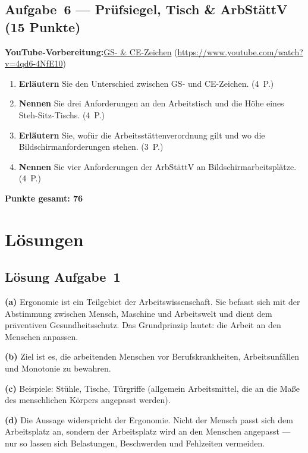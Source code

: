 \documentclass[11pt, a4paper]{article}
\begin{document}
\subsection*{Aufgabe~6 --- Prüfsiegel, Tisch \& ArbStättV (15 Punkte)}

\noindent\textbf{\color{bfwAccent}YouTube-Vorbereitung:}\enspace \href{https://www.youtube.com/watch?v=4qd6-4NfE10}{GS- \& CE-Zeichen} (\url{https://www.youtube.com/watch?v=4qd6-4NfE10})

\medskip
\begin{enumerate}[label=(\alph*)]
  \item \textbf{Erläutern} Sie den Unterschied zwischen GS- und CE-Zeichen. \hfill (4~P.)
  \item \textbf{Nennen} Sie drei Anforderungen an den Arbeitstisch und die Höhe eines Steh-Sitz-Tischs. \hfill (4~P.)
  \item \textbf{Erläutern} Sie, wofür die Arbeitsstättenverordnung gilt und wo die Bildschirm\-anforderungen stehen. \hfill (3~P.)
  \item \textbf{Nennen} Sie vier Anforderungen der ArbStättV an Bildschirmarbeitsplätze. \hfill (4~P.)
\end{enumerate}

\vspace{1em}
\noindent\textbf{Punkte gesamt: 76}

\newpage

\section{Lösungen}\label{loesungen}

\subsection*{Lösung Aufgabe~1}
\begin{loesung}
\textbf{(a)} Ergonomie ist ein Teilgebiet der Arbeitswissenschaft. Sie befasst sich mit der
Abstimmung zwischen Mensch, Maschine und Arbeitswelt und dient dem präventiven
Gesundheitsschutz. Das Grundprinzip lautet: die Arbeit an den Menschen anpassen.

\textbf{(b)} Ziel ist es, die arbeitenden Menschen vor Berufskrankheiten, Arbeitsunfällen
und Monotonie zu bewahren.

\textbf{(c)} Beispiele: Stühle, Tische, Türgriffe (allgemein Arbeitsmittel, die an die Maße
des menschlichen Körpers angepasst werden).

\textbf{(d)} Die Aussage widerspricht der Ergonomie. Nicht der Mensch passt sich dem
Arbeitsplatz an, sondern der Arbeitsplatz wird an den Menschen angepasst --- nur so lassen
sich Belastungen, Beschwerden und Fehlzeiten vermeiden.
\end{loesung}
\end{document}
